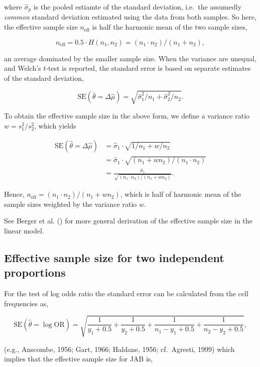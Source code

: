 \documentclass[
  man,
  floatsintext,
  longtable,
  nolmodern,
  notxfonts,
  notimes,
  colorlinks=true,linkcolor=blue,citecolor=blue,urlcolor=blue]{apa7}
\begin{document}
where \(\hat \sigma_p\) is the pooled estiamte of the standard
deviation, i.e.~the assumedly \emph{common} standard deviation estimated
using the data from both samples. So here, the effective sample size
\(n_\text{eff}\) is half the harmonic mean of the two sample sizes,

\[
n_\text{eff} = 0.5 \cdot H(n_1, n_2) = (n_1 \cdot n_2) / (n_1 + n_2),
\]

an average dominated by the smaller sample size. When the variance are
unequal, and Welch's \(t\)-test is reported, the standard error is based
on separate estimates of the standard deviation,

\[
\text{SE}(\hat \theta = \Delta \hat \mu) = \sqrt{\hat \sigma_1^2 / n_1 + \hat \sigma_2^2 / n_2}.
\]

To obtain the effective sample size in the above form, we define a
variance ratio \(w = s^2_1/s^2_2\), which yields

\[
\begin{aligned}
\text{SE}(\hat \theta = \Delta \hat \mu) & = \hat \sigma_1 \cdot \sqrt{1 / n_1 + w / n_2} \\
& = \hat \sigma_1 \cdot \sqrt{(n_1 + wn_2) / (n_1 \cdot n_2)} \\
& = \frac{ \hat \sigma_1 }{ \sqrt{(n_1 \cdot n_2) / (n_1 + wn_2)}}.
\end{aligned}
\]

Hence, \(n_\text{eff} = (n_1 \cdot n_2) / (n_1 + wn_2)\), which is half
of harmonic mean of the sample sizes weighted by the variance ratio
\(w\).

See Berger et al. () for more general
derivation of the effective sample size in the linear model.

\subsection{Effective sample size for two independent
proportions}\label{effective-sample-size-for-two-independent-proportions}

For the test of log odds ratio the standard error can be calculated from
the cell frequencies as,

\[
\text{SE}(\hat{\theta} = \log{\text{OR}}) = \sqrt{\frac{1}{y_1 + 0.5} + \frac{1}{y_2 + 0.5} + \frac{1}{n_1 - y_1 + 0.5} + \frac{1}{n_2 - y_2 + 0.5}},
\]

(e.g., Anscombe, 1956; Gart, 1966; Haldane, 1956; cf.~Agresti, 1999)
which implies that the effective sample size for JAB is,
\end{document}
